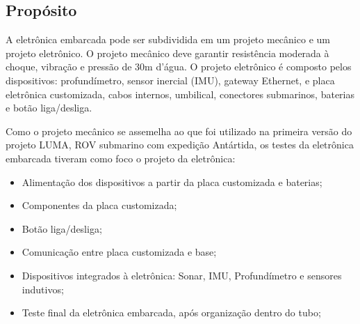 

\subsection{Propósito}
A eletrônica embarcada pode ser subdividida em um projeto mecânico e um projeto
eletrônico. O projeto mecânico deve garantir resistência moderada à choque,
vibração e pressão de 30m d'água. O projeto eletrônico é composto pelos
dispositivos: profundímetro, sensor inercial (IMU), gateway Ethernet, e
placa eletrônica customizada, cabos internos, umbilical, conectores
submarinos, baterias e botão liga/desliga.

Como o projeto mecânico se assemelha ao que foi utilizado na primeira versão do
projeto LUMA, ROV submarino com expedição Antártida, os testes da eletrônica embarcada tiveram
como foco o projeto da eletrônica:
\begin{itemize}
  \item Alimentação dos dispositivos a partir da placa customizada e
  baterias;
  \item Componentes da placa customizada;
  \item Botão liga/desliga;
  \item Comunicação entre placa customizada e base;
  \item Dispositivos integrados à eletrônica: Sonar, IMU,
  Profundímetro e sensores indutivos;
  \item Teste final da eletrônica embarcada, após organização dentro do tubo; 
\end{itemize} 
\label{proposito_sonar}

